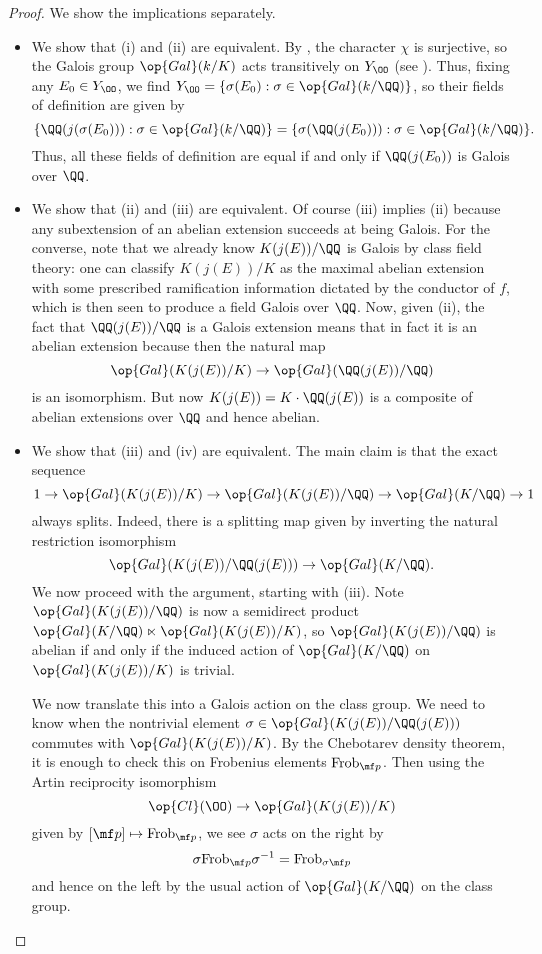 \documentclass[../notes.tex]{subfiles}
\begin{document}
\begin{proof}
	We show the implications separately.
	\begin{itemize}
		\item We show that (i) and (ii) are equivalent. By , the character $\chi$ is surjective, so the Galois group $\op{Gal}(k/K)$ acts transitively on $Y_\OO$ (see ). Thus, fixing any $E_0\in Y_\OO$, we find $Y_\OO=\{\sigma(E_0):\sigma\in\op{Gal}(k/\QQ)\}$, so their fields of definition are given by
		\[\{\QQ(j(\sigma(E_0))):\sigma\in\op{Gal}(k/\QQ)\}=\{\sigma(\QQ(j(E_0))):\sigma\in\op{Gal}(k/\QQ)\}.\]
		Thus, all these fields of definition are equal if and only if $\QQ(j(E_0))$ is Galois over $\QQ$.

		\item We show that (ii) and (iii) are equivalent. Of course (iii) implies (ii) because any subextension of an abelian extension succeeds at being Galois. For the converse, note that we already know $K(j(E))/\QQ$ is Galois by class field theory: one can classify $K(j(E))/K$ as the maximal abelian extension with some prescribed ramification information dictated by the conductor of $f$, which is then seen to produce a field Galois over $\QQ$. Now, given (ii), the fact that $\QQ(j(E))/\QQ$ is a Galois extension means that in fact it is an abelian extension because then the natural map
		\[\op{Gal}(K(j(E))/K)\to\op{Gal}(\QQ(j(E))/\QQ)\]
		is an isomorphism. But now $K(j(E))=K\cdot\QQ(j(E))$ is a composite of abelian extensions over $\QQ$ and hence abelian.

		\item We show that (iii) and (iv) are equivalent. The main claim is that the exact sequence
		\[1\to\op{Gal}(K(j(E))/K)\to\op{Gal}(K(j(E))/\QQ)\to\op{Gal}(K/\QQ)\to1\]
		always splits. Indeed, there is a splitting map given by inverting the natural restriction isomorphism
		\[\op{Gal}(K(j(E))/\QQ(j(E)))\to\op{Gal}(K/\QQ).\]
		We now proceed with the argument, starting with (iii). Note $\op{Gal}(K(j(E))/\QQ)$ is now a semidirect product $\op{Gal}(K/\QQ)\ltimes\op{Gal}(K(j(E))/K)$, so $\op{Gal}(K(j(E))/\QQ)$ is abelian if and only if the induced action of $\op{Gal}(K/\QQ)$ on $\op{Gal}(K(j(E))/K)$ is trivial.
		
		We now translate this into a Galois action on the class group. We need to know when the nontrivial element $\sigma\in\op{Gal}(K(j(E))/\QQ(j(E)))$ commutes with $\op{Gal}(K(j(E))/K)$. By the Chebotarev density theorem, it is enough to check this on Frobenius elements $\mathrm{Frob}_{\mf p}$. Then using the Artin reciprocity isomorphism
		\[\op{Cl}(\OO)\to\op{Gal}(K(j(E))/K)\]
		given by $[\mf p]\mapsto\mathrm{Frob}_{\mf p}$, we see $\sigma$ acts on the right by
		\[\sigma\mathrm{Frob}_{\mf p}\sigma^{-1}=\mathrm{Frob}_{\sigma\mf p}\]
		and hence on the left by the usual action of $\op{Gal}(K/\QQ)$ on the class group.


\end{itemize}
\end{proof}
\end{document}

